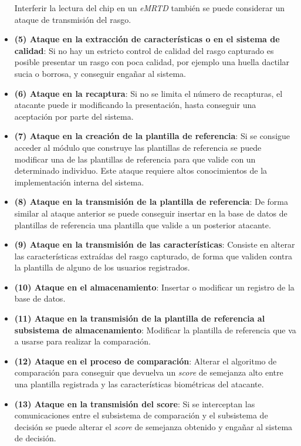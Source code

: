\begin{itemize}
    Interferir la lectura del chip en un \textit{\gls{eMRTD}} también se puede considerar un ataque de transmisión del rasgo. 
    \item 
    \textbf{(5) Ataque en la extracción de características o en el sistema de calidad}:
    Si no hay un estricto control de calidad del rasgo capturado es posible presentar un rasgo con poca calidad, por ejemplo una huella dactilar sucia o borrosa, y conseguir engañar al sistema.
    \item 
    \textbf{(6) Ataque en la recaptura}:
    Si no se limita el número de recapturas, el atacante puede ir modificando la presentación, hasta conseguir una aceptación por parte del sistema. 
    \item 
    \textbf{(7) Ataque en la creación de la plantilla de referencia}:
    Si se consigue acceder al módulo que construye las plantillas de referencia se puede modificar una de las plantillas de referencia para que valide con un determinado individuo. Este ataque requiere altos conocimientos de la implementación interna del sistema. 
    \item 
    \textbf{(8) Ataque en la transmisión de la plantilla de referencia}:
    De forma similar al ataque anterior se puede conseguir insertar en la base de datos de plantillas de referencia una plantilla que valide a un posterior atacante.
    \item 
    \textbf{(9) Ataque en la transmisión de las características}:
    Consiste en alterar las características extraídas del rasgo capturado, de forma que validen contra la plantilla de alguno de los usuarios registrados.
    \item 
    \textbf{(10) Ataque en el almacenamiento}:
    Insertar o modificar un registro de la base de datos.
    \item 
    \textbf{(11) Ataque en la transmisión de la plantilla de referencia al subsistema de almacenamiento}:
    Modificar la plantilla de referencia que va a usarse para realizar la comparación.
    \item 
    \textbf{(12) Ataque en el proceso de comparación}:
    Alterar el algoritmo de comparación para conseguir que devuelva un \textit{score} de semejanza alto entre una plantilla registrada y las características biométricas del atacante. 
    \item 
    \textbf{(13) Ataque en la transmisión del \textbf{score}}:
    Si se interceptan las comunicaciones entre el subsistema de comparación y el subsistema de decisión se puede alterar el \textit{score} de semejanza obtenido y engañar al sistema de decisión.

\end{itemize}
